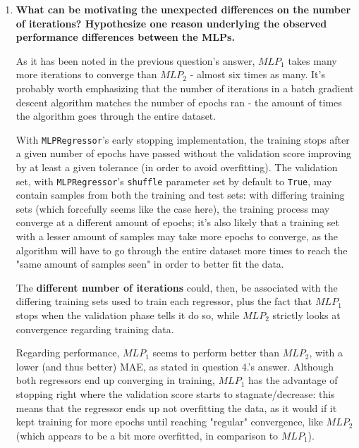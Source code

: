 \documentclass[12pt]{article}
\begin{document}
\begin{enumerate}[leftmargin=\labelsep,resume]
        \pagebreak

  \item \textbf{What can be motivating the unexpected differences on the number of iterations?
          Hypothesize one reason underlying the observed performance differences between the MLPs.}

        As it has been noted in the previous question's answer, $MLP_1$ takes many more
        iterations to converge than $MLP_2$ - almost six times as many. It's probably
        worth emphasizing that the number of iterations in a batch gradient descent
        algorithm matches the number of epochs ran - the amount of times the algorithm goes
        through the entire dataset.

        With \texttt{MLPRegressor}'s early stopping implementation, the training stops
        after a given number of epochs have passed without the validation score
        improving by at least a given tolerance (in order to avoid overfitting).
        The validation set, with \texttt{MLPRegressor}'s \texttt{shuffle} parameter
        set by default to \texttt{True}, may contain samples from both the training and test sets:
        with differing training sets (which forcefully seems like the case here),
        the training process may converge at a different amount of epochs; it's
        also likely that a training set with a lesser amount of samples may
        take more epochs to converge, as the algorithm will have to go through
        the entire dataset more times to reach the "same amount of samples seen"
        in order to better fit the data.

        The \textbf{different number of iterations} could, then, be associated
        with the differing training sets used to train each regressor, plus the
        fact that $MLP_1$ stops when the validation phase tells it do so, while $MLP_2$
        strictly looks at convergence regarding training data.

        Regarding performance, $MLP_1$ seems to perform better than $MLP_2$,
        with a lower (and thus better) MAE, as stated in question 4.'s answer.
        Although both regressors end up converging in training, $MLP_1$ has
        the advantage of stopping right where the validation score starts to
        stagnate/decrease: this means that the regressor ends up not overfitting
        the data, as it would if it kept training for more epochs until reaching
        "regular" convergence, like $MLP_2$ (which appears to be a bit more overfitted,
        in comparison to $MLP_1$).


\end{enumerate}
\end{document}
